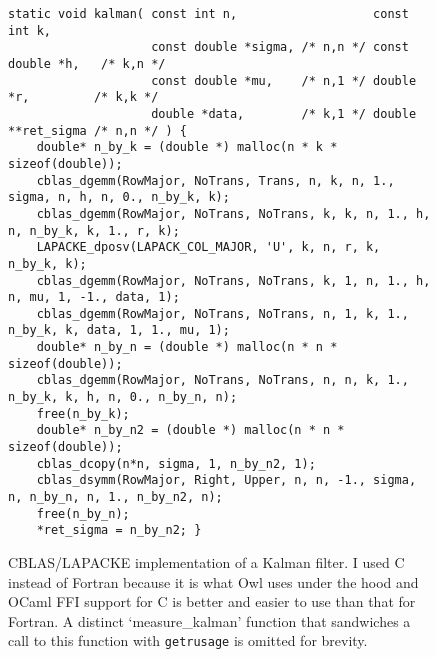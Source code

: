 \begin{figure}[h]
\begin{center}
    \begin{verbatim}
static void kalman( const int n,                   const int k,                
                    const double *sigma, /* n,n */ const double *h,   /* k,n */
                    const double *mu,    /* n,1 */ double *r,         /* k,k */
                    double *data,        /* k,1 */ double **ret_sigma /* n,n */ ) {
    double* n_by_k = (double *) malloc(n * k * sizeof(double));
    cblas_dgemm(RowMajor, NoTrans, Trans, n, k, n, 1., sigma, n, h, n, 0., n_by_k, k);
    cblas_dgemm(RowMajor, NoTrans, NoTrans, k, k, n, 1., h, n, n_by_k, k, 1., r, k);
    LAPACKE_dposv(LAPACK_COL_MAJOR, 'U', k, n, r, k, n_by_k, k);
    cblas_dgemm(RowMajor, NoTrans, NoTrans, k, 1, n, 1., h, n, mu, 1, -1., data, 1);
    cblas_dgemm(RowMajor, NoTrans, NoTrans, n, 1, k, 1., n_by_k, k, data, 1, 1., mu, 1);
    double* n_by_n = (double *) malloc(n * n * sizeof(double));
    cblas_dgemm(RowMajor, NoTrans, NoTrans, n, n, k, 1., n_by_k, k, h, n, 0., n_by_n, n);
    free(n_by_k);
    double* n_by_n2 = (double *) malloc(n * n * sizeof(double));
    cblas_dcopy(n*n, sigma, 1, n_by_n2, 1);
    cblas_dsymm(RowMajor, Right, Upper, n, n, -1., sigma, n, n_by_n, n, 1., n_by_n2, n);
    free(n_by_n);
    *ret_sigma = n_by_n2; }
    \end{verbatim}
    \caption{CBLAS/LAPACKE implementation of a Kalman filter. I used C instead
        of Fortran because it is what Owl uses under the hood and OCaml FFI
        support for C is better and easier to use than that for Fortran. A distinct
        `measure\_kalman' function that sandwiches a call to this function with
        \texttt{getrusage} is omitted for brevity.}\label{fig:cblas_kalman}

\end{center}
\end{figure}

